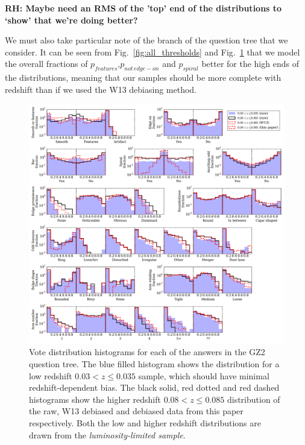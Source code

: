 \documentclass[useAMS,usenatbib]{mn2e}
\newcommand{\rh}[1]{{\bf \textcolor{RoyalPurple}{RH: #1}}}
\begin{document}
\rh{Maybe need an RMS of the 'top' end of the distributions to `show' that we're doing better?}

We must also take particular note of the branch of the question tree that we consider. It can be seen from Fig.~\ref{fig:all_thresholds} and Fig.~\ref{fig:all_histograms} that we model the overall fractions of $p_{features}$,$p_{not \, edge-on}$ and $p_{spiral}$ better for the high ends of the distributions, meaning that our samples should be more complete with redshift than if we used the W13 debiasing method. 

\begin{figure}
		\centering

        \includegraphics[width=1\textwidth]{Images/Bias/Debiasing/all_histograms.pdf}

        \caption{Vote distribution histograms for each of the answers in the GZ2 question tree. The blue filled histogram shows the distribution for a low redshift $0.03< z \leq 0.035$ sample, which should have minimal redshift-dependent bias. The black solid, red dotted and red dashed histograms show the higher redshift $0.08 < z \leq 0.085$ distribution of the raw, W13 debiased and debiased data from this paper respectively. Both the low and higher redshift distributions are drawn from the \textit{luminosity-limited sample}.}

        \label{fig:all_histograms}

\end{figure}
\end{document}

